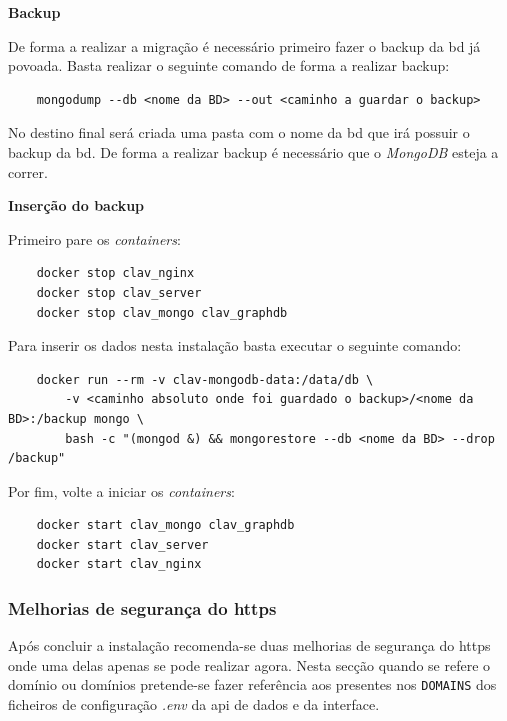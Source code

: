 \begin{description}
    \item \textbf{Backup}

    De forma a realizar a migração é necessário primeiro fazer o backup da \acrshort{bd} já povoada. Basta realizar o seguinte comando de forma a realizar backup:
    \footnotesize
    \begin{verbatim}
    mongodump --db <nome da BD> --out <caminho a guardar o backup>
    \end{verbatim}
    \normalsize
    \vspace{-0.5cm}
    No destino final será criada uma pasta com o nome da \acrshort{bd} que irá possuir o backup da \acrshort{bd}.
    De forma a realizar backup é necessário que o \textit{MongoDB} esteja a correr.
    \item \textbf{Inserção do backup}

    Primeiro pare os \textit{containers}:
    \footnotesize
    \begin{verbatim}
    docker stop clav_nginx
    docker stop clav_server
    docker stop clav_mongo clav_graphdb
    \end{verbatim}
    \normalsize
    \vspace{-0.3cm}
    Para inserir os dados nesta instalação basta executar o seguinte comando:
    \footnotesize
    \begin{verbatim}
    docker run --rm -v clav-mongodb-data:/data/db \
        -v <caminho absoluto onde foi guardado o backup>/<nome da BD>:/backup mongo \
        bash -c "(mongod &) && mongorestore --db <nome da BD> --drop /backup"
    \end{verbatim}
    \normalsize
    \vspace{-0.3cm}
    Por fim, volte a iniciar os \textit{containers}:
    \footnotesize
    \begin{verbatim}
    docker start clav_mongo clav_graphdb
    docker start clav_server
    docker start clav_nginx
    \end{verbatim}
    \normalsize
    \vspace{-0.5cm}
\end{description}

\subsubsection{Melhorias de segurança do \acrshort{https}}\label{sec:inst-melhorias}
Após concluir a instalação recomenda-se duas melhorias de segurança do \acrshort{https} onde uma delas apenas se pode realizar agora. Nesta secção quando se refere o domínio ou domínios pretende-se fazer referência aos presentes nos \texttt{DOMAINS} dos ficheiros de configuração \textit{.env} da \acrshort{api} de dados e da interface.

